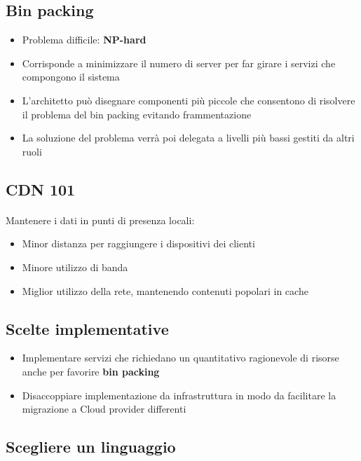 \documentclass[a4paper, 12pt]{report}
\begin{document}
          \subsection{Bin packing}
          \begin{itemize}
            \item Problema difficile: \textbf{NP-hard}
            \item Corrisponde a minimizzare il numero di server per far girare i servizi che compongono il sistema
            \item L’architetto può disegnare componenti più piccole che consentono di risolvere il problema del bin packing evitando frammentazione
            \item La soluzione del problema verrà poi delegata a livelli più bassi gestiti da altri ruoli 
          \end{itemize}
          \subsection{CDN 101}
          \paragraph{}Mantenere i dati in punti di presenza locali:
          \begin{itemize}
            \item Minor distanza per raggiungere i dispositivi dei clienti
            \item Minore utilizzo di banda
            \item Miglior utilizzo della rete, mantenendo contenuti popolari in cache
          \end{itemize}
          \subsection{Scelte implementative}
          \begin{itemize}
            \item Implementare servizi che richiedano un quantitativo ragionevole di risorse anche per favorire \textbf{bin packing}
            \item Disaccoppiare implementazione da infrastruttura in modo da facilitare la migrazione a Cloud provider differenti
          \end{itemize}
          \subsection{Scegliere un linguaggio}
\end{document}
